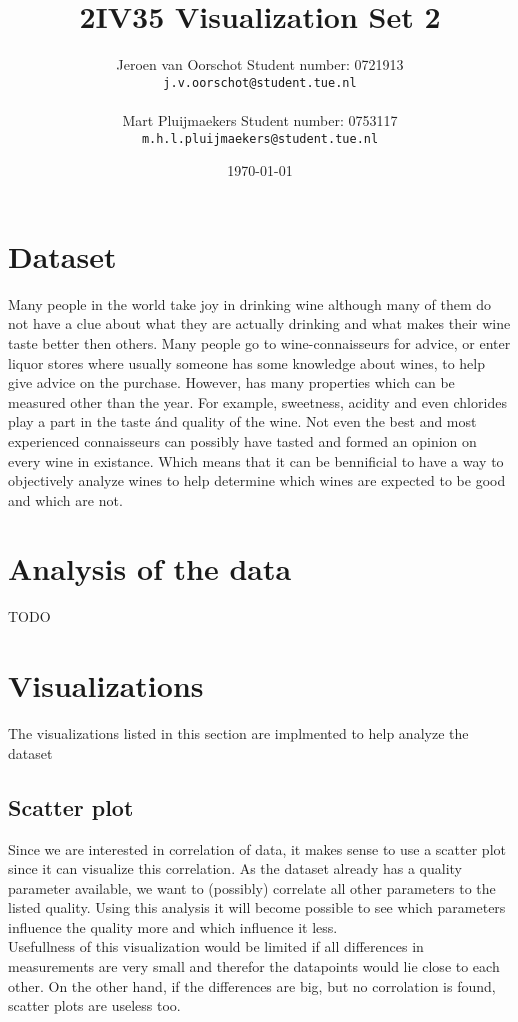 \documentclass[a4paper,twoside,11pt]{article}
\title{\vspace{-\baselineskip}\sffamily\bfseries 2IV35 Visualization Set 2}
\author{Jeroen van Oorschot \qquad Student number: 0721913 \\{\tt j.v.oorschot@student.tue.nl}\\ \\Mart Pluijmaekers \qquad Student number: 0753117 \\{\tt m.h.l.pluijmaekers@student.tue.nl}}
\date{\today}
\begin{document}
\maketitle

\pagebreak
\tableofcontents
\newpage
\section{Dataset}
Many people in the world take joy in drinking wine although many of them do not have a clue about what they are actually drinking and what makes their wine taste better then others. Many people go to wine-connaisseurs for advice, or enter liquor stores where usually someone has some knowledge about wines, to help give advice on the purchase. However, has many properties which can be measured other than the year. For example, sweetness, acidity and even chlorides play a part in the taste \'and quality of the wine. Not even the best and most experienced connaisseurs can possibly have tasted and formed an opinion on every wine in existance. Which means that it can be bennificial to have a way to objectively analyze wines to help determine which wines are expected to be good and which are not.

\section{Analysis of the data}
TODO


\section{Visualizations}
The visualizations listed in this section are implmented to help analyze the dataset

\subsection{Scatter plot}
Since we are interested in correlation of data, it makes sense to use a scatter plot since it can visualize this correlation. As the dataset already has a quality parameter available, we want to (possibly) correlate all other parameters to the listed quality. Using this analysis it will become possible to see which parameters influence the quality more and which influence it less. \\

Usefullness of this visualization would be limited if all differences in measurements are very small and therefor the datapoints would lie close to each other. On the other hand, if the differences are big, but no corrolation is found, scatter plots are useless too.
\end{document}
